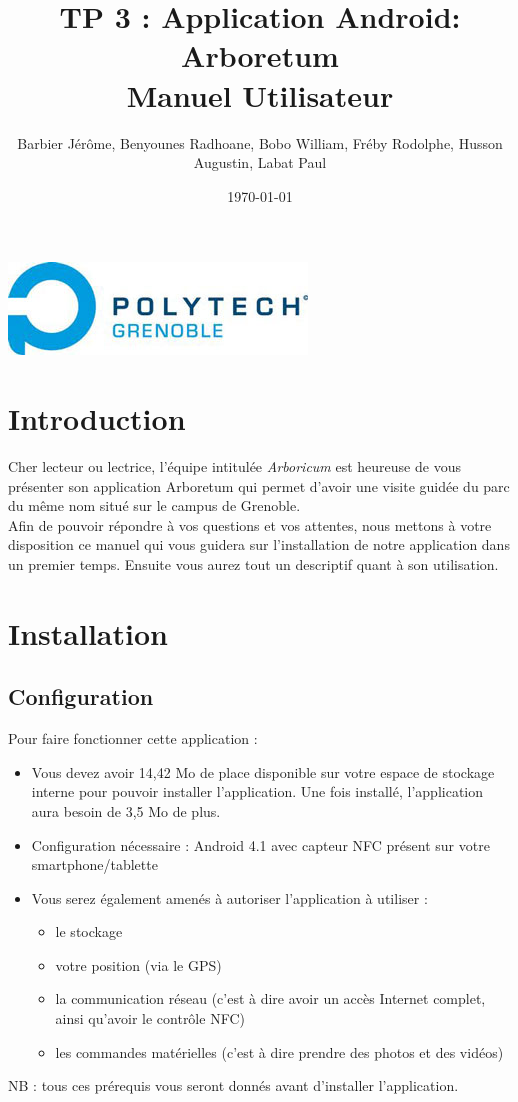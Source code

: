 \documentclass[a4paper,11pt]{article}
\title{TP 3 : Application Android: Arboretum\\
Manuel Utilisateur}
\author{Barbier Jérôme, Benyounes Radhoane, Bobo William, Fréby Rodolphe, Husson Augustin, Labat Paul}
\date{\today}
\begin{document}
  \maketitle

  \begin{center}
    \includegraphics{logoPol.jpg}\\
  \end{center}
  \tableofcontents
  \newpage
  
  \section{Introduction}
    Cher lecteur ou lectrice, l'équipe intitulée \textit{Arboricum} est heureuse de vous présenter son application Arboretum qui permet d'avoir une visite 
    guidée du parc du même nom situé sur le campus de Grenoble. \\
    Afin de pouvoir répondre à vos questions et vos attentes, nous mettons à votre disposition ce manuel qui vous guidera sur l'installation de
    notre application dans un premier temps. Ensuite vous aurez tout un descriptif quant à son utilisation.
  \section{Installation}
    \subsection{Configuration}
    Pour faire fonctionner cette application : 
    \begin{itemize}
     \item Vous devez avoir 14,42 Mo de place disponible sur votre espace de stockage interne pour pouvoir installer l'application. Une fois installé, l'application
     aura besoin de 3,5 Mo de plus.
     \item Configuration nécessaire : Android 4.1 avec capteur NFC présent sur votre smartphone/tablette
     \item Vous serez également amenés à autoriser l'application à utiliser : 
     \begin{itemize}
      \item le stockage
      \item votre position (via le GPS)
      \item la communication réseau (c'est à dire avoir un accès Internet complet, ainsi qu'avoir le contrôle NFC)
      \item les commandes matérielles (c'est à dire prendre des photos et des vidéos)
     \end{itemize}
    \end{itemize}
NB : tous ces prérequis vous seront donnés avant d'installer l'application.
\end{document}
